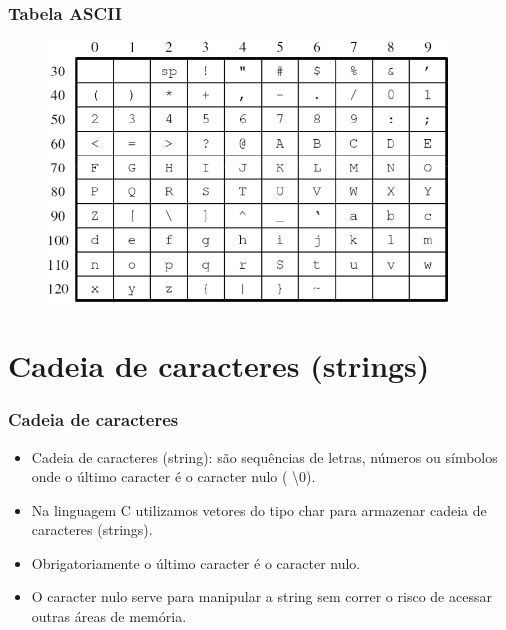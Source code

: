 \documentclass[aspectratio=169]{beamer}
\begin{document}

\begin{frame}
\frametitle{Tabela ASCII}
 
\begin{figure}[!h]
  \centering
  \includegraphics[width=300pt]{imgs/tabela_ascii.png}
  \label{fig_tabela_ascii}
\end{figure}
\end{frame}

\section{Cadeia de caracteres (strings)}

\begin{frame}
\frametitle{Cadeia de caracteres}
\begin{itemize}
\item Cadeia de caracteres (string): são sequências de letras, números ou símbolos onde o último caracter é o caracter nulo ( \textbackslash 0).
\item Na linguagem C utilizamos vetores do tipo char para armazenar cadeia de caracteres (strings).
\item Obrigatoriamente o último caracter é o caracter nulo. 
\item O caracter nulo serve para manipular a string sem correr o risco de acessar outras áreas de memória.
\end{itemize}
\end{frame}

\end{document}
